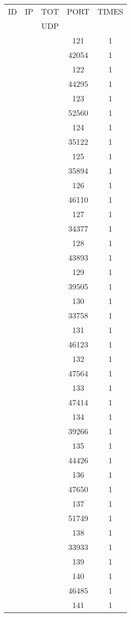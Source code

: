 \documentclass[a4paper]{scrartcl}
\begin{document}
\begin{minipage}[b]{0.5\linewidth}
\begin{tabular}{| c | c | c | c | c |}
\hline
ID & IP & TOT & PORT & TIMES \\ 
   &    & UDP &      &       \\ 
\hline
& & & 121 & 1 \\ & & & 42054 & 1 \\ & & & 122 & 1 \\ & & & 44295 & 1 \\ & & & 123 & 1 \\ & & & 52560 & 1 \\ & & & 124 & 1 \\ & & & 35122 & 1 \\ & & & 125 & 1 \\ & & & 35894 & 1 \\ & & & 126 & 1 \\ & & & 46110 & 1 \\ & & & 127 & 1 \\ & & & 34377 & 1 \\ & & & 128 & 1 \\ & & & 43893 & 1 \\ & & & 129 & 1 \\ & & & 39505 & 1 \\ & & & 130 & 1 \\ & & & 33758 & 1 \\ & & & 131 & 1 \\ & & & 46123 & 1 \\ & & & 132 & 1 \\ & & & 47564 & 1 \\ & & & 133 & 1 \\ & & & 47414 & 1 \\ & & & 134 & 1 \\ & & & 39266 & 1 \\ & & & 135 & 1 \\ & & & 44426 & 1 \\ & & & 136 & 1 \\ & & & 47650 & 1 \\ & & & 137 & 1 \\ & & & 51749 & 1 \\ & & & 138 & 1 \\ & & & 33933 & 1 \\ & & & 139 & 1 \\ & & & 140 & 1 \\ & & & 46485 & 1 \\ & & & 141 & 1 \\ \hline\end{tabular}\end{minipage} \hfill\begin{minipage}[b]{0.5\linewidth}\begin{tabular}{| c | c | c | c | c |}

\end{tabular}
\end{minipage}
\end{document}
